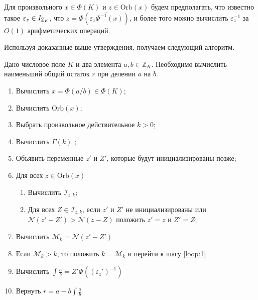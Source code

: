 \documentclass[_00_dissertation.tex]{subfiles}
\begin{document}
\begin{remark}
    Для произвольного $x \in \Phi(K)$ и $z \in \textrm{Orb}(x)$ будем предполагать, что известно такое $\varepsilon_z \in I_{\mathbb{Z}_K}$, что $z = \Phi(\overline{\varepsilon_z \Phi^{-1}(x)})$, и более того можно вычислить $\varepsilon_z^{-1}$ за $O(1)$ арифметических операций.
\end{remark}

Используя доказанные выше утверждения, получаем следующий алгоритм.

\begin{algorithm}\label{algorithm:least_norm_remainder}
    Дано числовое поле $K$ и два элемента $a, b \in \mathbb{Z}_K$.
    Необходимо вычислить наименьший общий остаток $r$ при делении $a$ на $b$.

    \begin{enumerate}
        \item Вычислить $x = \Phi(a/b) \in \Phi(K)$;
        
        \item Вычислить $\textrm{Orb}(x)$;

        \item Выбрать произвольное действительное $k > 0$;

        \item Вычислить $\Gamma(k)$ \label{loop:1};

        \item Объявить переменные $z'$ и $Z'$, которые будут инициализированы позже;

        \item Для всех $z \in \textrm{Orb}(x)$
        \begin{enumerate}
            \item Вычислить $\mathcal{I}_{z, k}$;

            \item Для всех $Z \in \mathcal{I}_{z, k}$, если $z'$ и $Z'$ не инициализированы или $\mathcal{N}(z' - Z') > \mathcal{N}(z - Z)$ положить $z' = z$ и $Z' = Z$;
        \end{enumerate}

        \item Вычислить $\mathcal{M}_k = \mathcal{N}(z' - Z')$
        
        \item Если $\mathcal{M}_k > k$, то положить $k = \mathcal{M}_k$ и перейти к шагу \ref{loop:1}

        \item Вычислить $\int{\frac{a}{b}} = Z'\Phi((\varepsilon_z')^{-1})$

        \item Вернуть $r = a - b \int{\frac{a}{b}}$
    \end{enumerate}
\end{algorithm}
\end{document}

